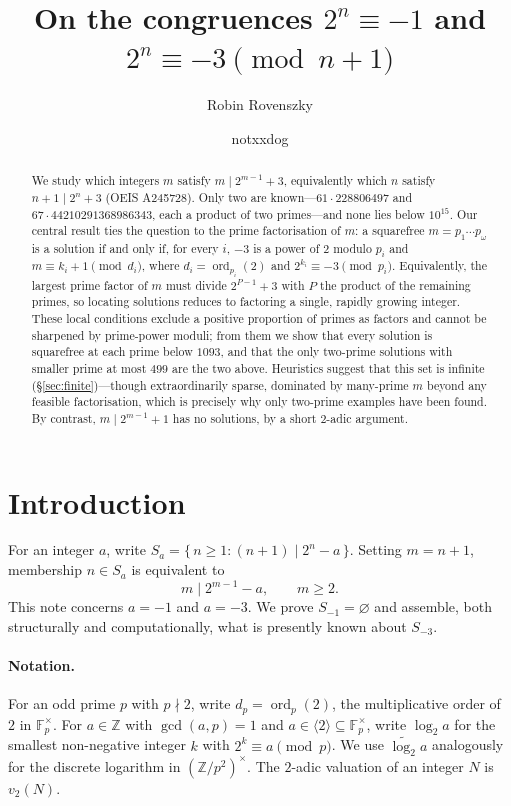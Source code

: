 \documentclass[11pt,reqno]{amsart}
\title[On the congruences $2^{n}\equiv-1$ and $2^{n}\equiv-3\pmod{n+1}$]{On the congruences $2^{n}\equiv-1$ and $2^{n}\equiv-3 \pmod{n+1}$}
\author{Robin Rovenszky}
\author{notxxdog}
\date{}
\theoremstyle{plain}
\theoremstyle{definition}
\theoremstyle{remark}
\newcommand{\Z}{\mathbb{Z}}
\newcommand{\F}{\mathbb{F}}
\newcommand{\ord}{\operatorname{ord}}
\newcommand{\gen}[1]{\langle #1 \rangle}
\begin{document}
\begin{abstract}
We study which integers $m$ satisfy $m\mid 2^{m-1}+3$, equivalently which $n$ satisfy
$n+1\mid 2^{n}+3$ (OEIS A245728). Only two are known---$61\cdot 228806497$ and
$67\cdot 44210291368986343$, each a product of two primes---and none lies below $10^{15}$. Our
central result ties the question to the prime factorisation of $m$: a squarefree
$m=p_{1}\cdots p_{\omega}$ is a solution if and only if, for every $i$, $-3$ is a power of $2$
modulo $p_{i}$ and $m\equiv k_{i}+1\pmod{d_{i}}$, where $d_{i}=\ord_{p_{i}}(2)$ and
$2^{k_{i}}\equiv-3\pmod{p_{i}}$. Equivalently, the largest prime factor of $m$ must divide
$2^{P-1}+3$ with $P$ the product of the remaining primes, so locating solutions reduces to
factoring a single, rapidly growing integer. These local conditions exclude a positive
proportion of primes as factors and cannot be sharpened by prime-power moduli; from them we show
that every solution is squarefree at each prime below $1093$, and that the only two-prime
solutions with smaller prime at most $499$ are the two above. Heuristics suggest that this set is infinite (\S\ref{sec:finite})---though extraordinarily
sparse, dominated by many-prime $m$ beyond any feasible factorisation, which is precisely why
only two-prime examples have been found. By contrast, $m\mid 2^{m-1}+1$ has no solutions, by a
short $2$-adic argument.
\end{abstract}

\maketitle
\tableofcontents

\section{Introduction}

For an integer $a$, write $S_{a}=\{\,n\ge 1:(n+1)\mid 2^{n}-a\,\}$. Setting $m=n+1$, membership
$n\in S_{a}$ is equivalent to
\begin{equation}\label{eq:main}
m\mid 2^{m-1}-a,\qquad m\ge 2.
\end{equation}
This note concerns $a=-1$ and $a=-3$. We prove $S_{-1}=\varnothing$ and assemble, both
structurally and computationally, what is presently known about $S_{-3}$.

\paragraph{Notation.}
For an odd prime $p$ with $p\nmid 2$, write $d_{p}=\ord_{p}(2)$, the multiplicative order of $2$
in $\F_{p}^{\times}$. For $a\in\Z$ with $\gcd(a,p)=1$ and $a\in\gen{2}\subseteq\F_{p}^{\times}$,
write $\log_{2}a$ for the smallest non-negative integer $k$ with $2^{k}\equiv a\pmod{p}$. We use
$\widetilde{\log_{2}}a$ analogously for the discrete logarithm in $(\Z/p^{2})^{\times}$. The
$2$-adic valuation of an integer $N$ is $v_{2}(N)$.
\end{document}
